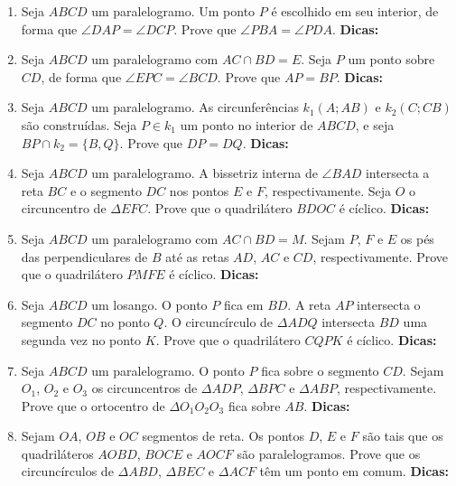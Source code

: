 \documentclass{article}
\newcommand{\dica}{\textbf{Dicas:}}
\begin{document}
\begin{multicols}{2}
\begin{enumerate}
    \item Seja $ABCD$ um paralelogramo. Um ponto $P$ é escolhido em seu interior, de forma que $\angle DAP=\angle DCP$. Prove que $\angle PBA=\angle PDA$. \dica %
    
    \item Seja $ABCD$ um paralelogramo com $AC\cap BD=E$. Seja $P$ um ponto sobre $CD$, de forma que $\angle EPC=\angle BCD$. Prove que $AP=BP$. \dica %
    
    \item Seja $ABCD$ um paralelogramo. As circunferências $k_1(A;AB)$ e $k_2(C;CB)$ são construídas. Seja $P\in k_1$ um ponto no interior de $ABCD$, e seja $BP\cap k_2=\{B,Q\}$. Prove que $DP=DQ$. \dica %
    
    \item Seja $ABCD$ um paralelogramo. A bissetriz interna de $\angle BAD$ intersecta a reta $BC$ e o segmento $DC$ nos pontos $E$ e $F$, respectivamente. Seja $O$ o circuncentro de $\Delta EFC$. Prove que o quadrilátero $BDOC$ é cíclico. \dica %
    
    \item Seja $ABCD$ um paralelogramo com $AC\cap BD=M$. Sejam $P$, $F$ e $E$ os pés das perpendiculares de $B$ até as retas $AD$, $AC$ e $CD$, respectivamente. Prove que o quadrilátero $PMFE$ é cíclico. \dica %
    
    \item Seja $ABCD$ um losango. O ponto $P$ fica em $BD$. A reta $AP$ intersecta o segmento $DC$ no ponto $Q$. O circuncírculo de $\Delta ADQ$ intersecta $BD$ uma segunda vez no ponto $K$. Prove que o quadrilátero $CQPK$ é cíclico. \dica %
    
    \item Seja $ABCD$ um paralelogramo. O ponto $P$ fica sobre o segmento $CD$. Sejam $O_1$, $O_2$ e $O_3$ os circuncentros de $\Delta ADP$, $\Delta BPC$ e $\Delta ABP$, respectivamente. Prove que o ortocentro de $\Delta O_1O_2O_3$ fica sobre $AB$. \dica %
    
    \item Sejam $OA$, $OB$ e $OC$ segmentos de reta. Os pontos $D$, $E$ e $F$ são tais que os quadriláteros $AOBD$, $BOCE$ e $AOCF$ são paralelogramos. Prove que os circuncírculos de $\Delta ABD$, $\Delta BEC$ e $\Delta ACF$ têm um ponto em comum. \dica %
    

\end{enumerate}
\end{multicols}
\end{document}

